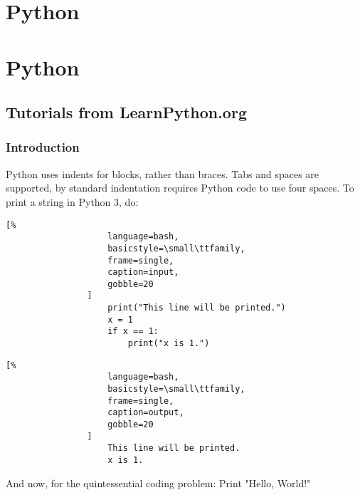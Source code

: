 \documentclass[crop=false,class=article,oneside]{standalone}
\begin{document}
    \ifx\ifcoursesprogrammingtutorials\undefined
        \section*{Python}
        \setcounter{section}{4}
    \else
        \section{Python}
    \fi
    \subsection{Tutorials from LearnPython.org}
        \subsubsection{Introduction}
            Python uses indents for blocks, rather than braces.
            Tabs and spaces are supported, by standard indentation
            requires Python code to use four spaces.
            To print a string in Python 3, do:
            \newline
            \begin{minipage}[t]{.48\textwidth}
                \centering
                \begin{lstlisting}[%
                    language=bash,
                    basicstyle=\small\ttfamily,
                    frame=single,
                    caption=input,
                    gobble=20
                ]
                    print("This line will be printed.")
                    x = 1
                    if x == 1:
                        print("x is 1.")
                \end{lstlisting}
            \end{minipage}
            \hfill
            \begin{minipage}[t]{.48\textwidth}
                \centering
                \begin{lstlisting}[%
                    language=bash,
                    basicstyle=\small\ttfamily,
                    frame=single,
                    caption=output,
                    gobble=20
                ]
                    This line will be printed.
                    x is 1.
                \end{lstlisting}
            \end{minipage}
            And now, for the quintessential coding problem:
            Print "Hello, World!"\newline
\end{document}
